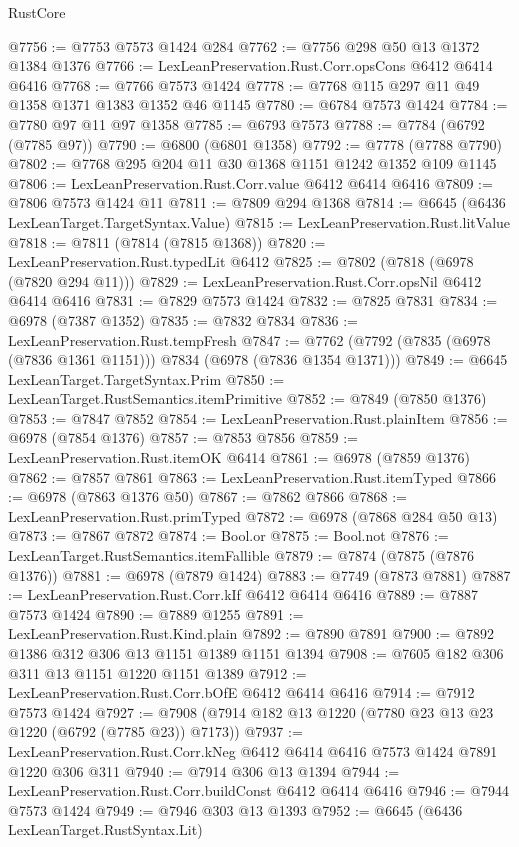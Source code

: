 \begin{lexlean}{RustCore}
\begin{coremodule}
@7756 := @7753 @7573 @1424 @284
@7762 := @7756 @298 @50 @13 @1372 @1384 @1376
@7766 := LexLeanPreservation.Rust.Corr.opsCons @6412 @6414 @6416
@7768 := @7766 @7573 @1424
@7778 := @7768 @115 @297 @11 @49 @1358 @1371 @1383 @1352 @46 @1145
@7780 := @6784 @7573 @1424
@7784 := @7780 @97 @11 @97 @1358
@7785 := @6793 @7573
@7788 := @7784 (@6792 (@7785 @97))
@7790 := @6800 (@6801 @1358)
@7792 := @7778 (@7788 @7790)
@7802 := @7768 @295 @204 @11 @30 @1368 @1151 @1242 @1352 @109 @1145
@7806 := LexLeanPreservation.Rust.Corr.value @6412 @6414 @6416
@7809 := @7806 @7573 @1424 @11
@7811 := @7809 @294 @1368
@7814 := @6645 (@6436 LexLeanTarget.TargetSyntax.Value)
@7815 := LexLeanPreservation.Rust.litValue
@7818 := @7811 (@7814 (@7815 @1368))
@7820 := LexLeanPreservation.Rust.typedLit @6412
@7825 := @7802 (@7818 (@6978 (@7820 @294 @11)))
@7829 := LexLeanPreservation.Rust.Corr.opsNil @6412 @6414 @6416
@7831 := @7829 @7573 @1424
@7832 := @7825 @7831
@7834 := @6978 (@7387 @1352)
@7835 := @7832 @7834
@7836 := LexLeanPreservation.Rust.tempFresh
@7847 := @7762 (@7792 (@7835 (@6978 (@7836 @1361 @1151))) @7834 (@6978 (@7836 @1354 @1371)))
@7849 := @6645 LexLeanTarget.TargetSyntax.Prim
@7850 := LexLeanTarget.RustSemantics.itemPrimitive
@7852 := @7849 (@7850 @1376)
@7853 := @7847 @7852
@7854 := LexLeanPreservation.Rust.plainItem
@7856 := @6978 (@7854 @1376)
@7857 := @7853 @7856
@7859 := LexLeanPreservation.Rust.itemOK @6414
@7861 := @6978 (@7859 @1376)
@7862 := @7857 @7861
@7863 := LexLeanPreservation.Rust.itemTyped
@7866 := @6978 (@7863 @1376 @50)
@7867 := @7862 @7866
@7868 := LexLeanPreservation.Rust.primTyped
@7872 := @6978 (@7868 @284 @50 @13)
@7873 := @7867 @7872
@7874 := Bool.or
@7875 := Bool.not
@7876 := LexLeanTarget.RustSemantics.itemFallible
@7879 := @7874 (@7875 (@7876 @1376))
@7881 := @6978 (@7879 @1424)
@7883 := @7749 (@7873 @7881)
@7887 := LexLeanPreservation.Rust.Corr.kIf @6412 @6414 @6416
@7889 := @7887 @7573 @1424
@7890 := @7889 @1255
@7891 := LexLeanPreservation.Rust.Kind.plain
@7892 := @7890 @7891
@7900 := @7892 @1386 @312 @306 @13 @1151 @1389 @1151 @1394
@7908 := @7605 @182 @306 @311 @13 @1151 @1220 @1151 @1389
@7912 := LexLeanPreservation.Rust.Corr.bOfE @6412 @6414 @6416
@7914 := @7912 @7573 @1424
@7927 := @7908 (@7914 @182 @13 @1220 (@7780 @23 @13 @23 @1220 (@6792 (@7785 @23)) @7173))
@7937 := LexLeanPreservation.Rust.Corr.kNeg @6412 @6414 @6416 @7573 @1424 @7891 @1220 @306 @311
@7940 := @7914 @306 @13 @1394
@7944 := LexLeanPreservation.Rust.Corr.buildConst @6412 @6414 @6416
@7946 := @7944 @7573 @1424
@7949 := @7946 @303 @13 @1393
@7952 := @6645 (@6436 LexLeanTarget.RustSyntax.Lit)

\end{coremodule}
\end{lexlean}
